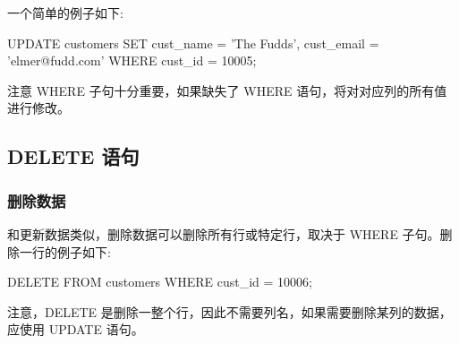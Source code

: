 一个简单的例子如下:
\begin{sql}
UPDATE customers
    SET cust_name = 'The Fudds', cust_email = 'elmer@fudd.com'
    WHERE cust_id = 10005;
\end{sql}

注意 WHERE 子句十分重要，如果缺失了 WHERE 语句，将对对应列的所有值进行修改。

\subsection{DELETE 语句}

\subsubsection{删除数据}

和更新数据类似，删除数据可以删除所有行或特定行，取决于 WHERE 子句。删除一行的例子如下:

\begin{sql}
DELETE FROM customers
    WHERE cust_id = 10006;
\end{sql}

注意，DELETE 是删除一整个行，因此不需要列名，如果需要删除某列的数据，应使用 UPDATE 语句。

\newpage